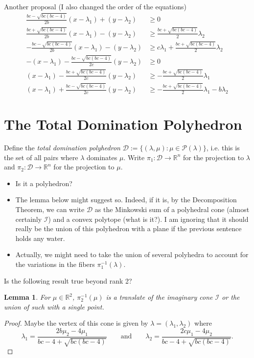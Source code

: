 \documentclass{amsart}
\newtheorem{lemma}[theorem]{Lemma}
\numberwithin{theorem}{section}
\newcommand{\cD}{\mathcal{D}}
\newcommand{\cI}{\mathcal{I}}
\newcommand{\cP}{\mathcal{P}}
\newcommand{\RR}{\mathbb{R}}
\begin{document}
  Another proposal (I also changed the order of the equations)
  \begin{align}
    \frac{b c-\sqrt{b c (b c-4)}}{2 b}(x-\lambda_1)+(y-\lambda_2) & \geq0
    \\
    \frac{b c+\sqrt{b c (b c-4)}}{2 b}(x-\lambda_1)-(y-\lambda_2) & \geq \frac{b c+\sqrt{b c (b c-4)}}{2}\lambda_2 
    \\
    -\frac{b c-\sqrt{b c (b c-4)}}{2 b}(x-\lambda_1)-(y-\lambda_2)& \geq c\lambda_1+\frac{b c+\sqrt{b c (b c-4)}}{2}\lambda_2
    \\
    -(x-\lambda_1)-\frac{b c-\sqrt{b c (b c-4)}}{2 c}(y-\lambda_2)& \geq0
    \\
    (x-\lambda_1)-\frac{b c+\sqrt{b c (b c-4)}}{2 c}(y-\lambda_2) & \geq -\frac{b c+\sqrt{b c (b c-4)}}{2}\lambda_1
    \\
    (x-\lambda_1)+\frac{b c-\sqrt{b c (b c-4)}}{2 c}(y-\lambda_2) & \geq -\frac{b c+\sqrt{b c (b c-4)}}{2}\lambda_1-b\lambda_2
  \end{align}

  \section{The Total Domination Polyhedron}

  Define the \emph{total domination polyhedron} $\cD:=\{(\lambda,\mu):\mu\in\cP(\lambda)\}$, i.e. this is the set of all pairs where $\lambda$ dominates $\mu$.
  Write $\pi_1:\cD\to\RR^n$ for the projection to $\lambda$ and $\pi_2:\cD\to\RR^n$ for the projection to $\mu$.
  \begin{itemize}
    \item Is it a polyhedron?
    \item The lemma below might suggest so.  
      Indeed, if it is, by the Decomposition Theorem, we can write $\cD$ as the Minkowski sum of a polyhedral cone (almost certainly $\cI$) and a convex polytope (what is it?).
      I am ignoring that it should really be the union of this polyhedron with a plane if the previous sentence holds any water.
    \item Actually, we might need to take the union of several polyhedra to account for the variations in the fibers $\pi_1^{-1}(\lambda)$.
  \end{itemize}

  Is the following result true beyond rank 2?
  \begin{lemma}
    For $\mu\in\RR^2$, $\pi_2^{-1}(\mu)$ is a translate of the imaginary cone $\cI$ or the union of such with a single point.
  \end{lemma}
  \begin{proof}
    Maybe the vertex of this cone is given by $\lambda=(\lambda_1,\lambda_2)$ where
    \[\lambda_1=\frac{2b\mu_2-4\mu_1}{bc-4+\sqrt{bc(bc-4)}} \qquad \text{and} \qquad \lambda_2=\frac{2c\mu_1-4\mu_2}{bc-4+\sqrt{bc(bc-4)}}.\]
  \end{proof}
\end{document}
